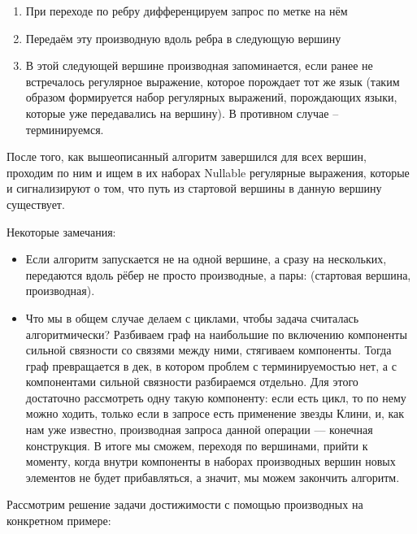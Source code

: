 \begin{enumerate}
    \item При переходе по ребру дифференцируем запрос по метке на нём
    \item Передаём эту производную вдоль ребра в следующую вершину
    \item В этой следующей вершине производная запоминается, если ранее не встречалось регулярное выражение, которое порождает тот же язык (таким образом формируется набор регулярных выражений, порождающих языки, которые уже передавались на вершину). В противном случае -- терминируемся.
\end{enumerate}

После того, как вышеописанный алгоритм завершился для всех вершин, проходим по ним и ищем в их наборах Nullable регулярные выражения, которые и сигнализируют о том, что путь из стартовой вершины в данную вершину существует.

Некоторые замечания:

\begin{itemize}
    \item Если алгоритм запускается не на одной вершине, а сразу на нескольких, передаются вдоль рёбер не просто производные, а пары: (стартовая вершина, производная).
    \item Что мы в общем случае делаем с циклами, чтобы задача считалась алгоритмически? Разбиваем граф на наибольшие по включению компоненты сильной связности со связями между ними, стягиваем компоненты. Тогда граф превращается в дек, в котором проблем с терминируемостью нет, а с компонентами сильной связности разбираемся отдельно. Для этого достаточно рассмотреть одну такую компоненту: если есть цикл, то по нему можно ходить, только если в запросе есть применение звезды Клини, и, как нам уже известно, производная запроса данной операции --- конечная конструкция. В итоге мы сможем, переходя по вершинами, прийти к моменту, когда внутри компоненты в наборах производных вершин новых элементов не будет прибавляться, а значит, мы можем закончить алгоритм.
\end{itemize}

Рассмотрим решение задачи достижимости с помощью производных на конкретном примере:

